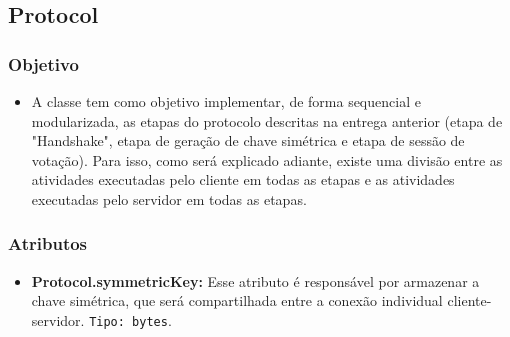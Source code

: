 \documentclass[10pt]{article}
\begin{document}
\begin{itemize}
    \subsection{\Large Protocol}
        \subsubsection{\large Objetivo}
            \begin{itemize}
            \item A classe tem como objetivo implementar, de forma sequencial e modularizada, as etapas do protocolo descritas na entrega anterior (etapa de "Handshake", etapa de geração de chave simétrica e etapa de sessão de votação). Para isso, como será explicado adiante, existe uma divisão entre as atividades executadas pelo cliente em todas as etapas e as atividades executadas pelo servidor em todas as etapas.
            \end{itemize}
        \subsubsection{\large Atributos}
            \begin{itemize}
            \item \textbf{Protocol.symmetricKey:}  Esse atributo é responsável por armazenar a chave simétrica, que será compartilhada entre a conexão individual cliente-servidor. \texttt{Tipo: bytes}.
            \end{itemize}

\end{itemize}
\end{document}
